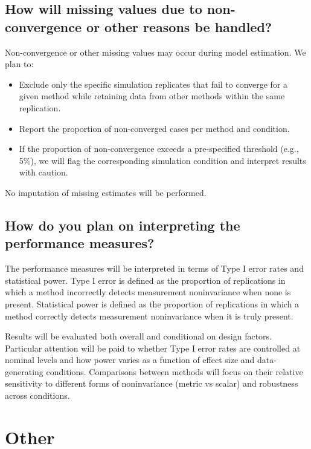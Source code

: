 \documentclass[
  man,
  floatsintext]{apa7}
\providecommand{\tightlist}{%
  \setlength{\itemsep}{0pt}\setlength{\parskip}{0pt}}
\begin{document}
\subsection{How will missing values due to non-convergence or other
reasons be
handled?}\label{how-will-missing-values-due-to-non-convergence-or-other-reasons-be-handled}

Non-convergence or other missing values may occur during model
estimation. We plan to:

\begin{itemize}
\tightlist
\item
  Exclude only the specific simulation replicates that fail to converge
  for a given method while retaining data from other methods within the
  same replication.
\item
  Report the proportion of non-converged cases per method and condition.
\item
  If the proportion of non-convergence exceeds a pre-specified threshold
  (e.g., 5\%), we will flag the corresponding simulation condition and
  interpret results with caution.
\end{itemize}

No imputation of missing estimates will be performed.

\subsection{How do you plan on interpreting the performance
measures?}\label{how-do-you-plan-on-interpreting-the-performance-measures}

The performance measures will be interpreted in terms of Type I error
rates and statistical power. Type I error is defined as the proportion
of replications in which a method incorrectly detects measurement
noninvariance when none is present. Statistical power is defined as the
proportion of replications in which a method correctly detects
measurement noninvariance when it is truly present.

Results will be evaluated both overall and conditional on design
factors. Particular attention will be paid to whether Type I error rates
are controlled at nominal levels and how power varies as a function of
effect size and data-generating conditions. Comparisons between methods
will focus on their relative sensitivity to different forms of
noninvariance (metric vs scalar) and robustness across conditions.

\section{Other}\label{other}
\end{document}
